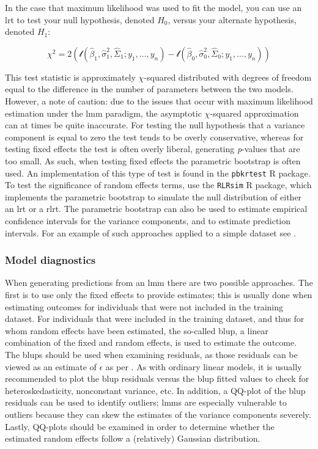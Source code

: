 \documentclass{report}
\begin{document}
In the case that maximum likelihood was used to fit the model, you can use an \gls{lrt} to test your null hypothesis, denoted $H_0$, versus your alternate hypothesis, denoted $H_1$:

\begin{equation}\label{eq:glm-glmm-lrt-statistic}
    \chi^2 = 2 \left(\mathcal{l}\left(\hat{\beta}_1, \hat{\sigma}^2_1, \hat{\Sigma}_1; y_1, \dots, y_n\right) - \mathcal{l}\left(\hat{\beta}_0, \hat{\sigma}^2_0, \hat{\Sigma}_0; y_1, \dots, y_n\right)\right)
\end{equation}

This test statistic is approximately $\chi$-squared distributed with degrees of freedom equal to the difference in the number of parameters between the two models. However, a note of caution: due to the issues that occur with maximum likelihood estimation under the \gls{lmm} paradigm, the asymptotic $\chi$-squared approximation can at times be quite inaccurate. For testing the null hypothesis that a variance component is equal to zero the test tends to be overly conservative, whereas for testing fixed effects the test is often overly liberal, generating \textit{p}-values that are too small. As such, when testing fixed effects the parametric bootstrap is often used. An implementation of this type of test is found in the \texttt{pbkrtest} R package. To test the significance of random effects terms, use the \texttt{RLRsim} R package, which implements the parametric bootstrap to simulate the null distribution of either an \gls{lrt} or a \gls{rlrt}. The parametric bootstrap can also be used to estimate empirical confidence intervals for the variance components, and to estimate prediction intervals. For an example of such approaches applied to a simple dataset see \cite[Chapter~10.2]{faraway_extending_2016}. 

\subsubsection{Model diagnostics}

When generating predictions from an \gls{lmm} there are two possible approaches. The first is to use only the fixed effects to provide estimates; this is usually done when estimating outcomes for individuals that were not included in the training dataset. For individuals that were included in the training dataset, and thus for whom random effects have been estimated, the so-called \gls{blup}, a linear combination of the fixed and random effects, is used to estimate the outcome. The \glspl{blup} should be used when examining residuals, as those residuals can be viewed as an estimate of $\epsilon$ as per \cite[Chapter~10.5]{faraway_extending_2016}. As with ordinary linear models, it is usually recommended to plot the \gls{blup} residuals versus the \gls{blup} fitted values to check for heteroskedasticity, nonconstant variance, etc. In addition, a QQ-plot of the \gls{blup} residuals can be used to identify outliers; \glspl{lmm} are especially vulnerable to outliers because they can skew the estimates of the variance components severely. Lastly, QQ-plots should be examined in order to determine whether the estimated random effects follow a (relatively) Gaussian distribution. 
\end{document}

